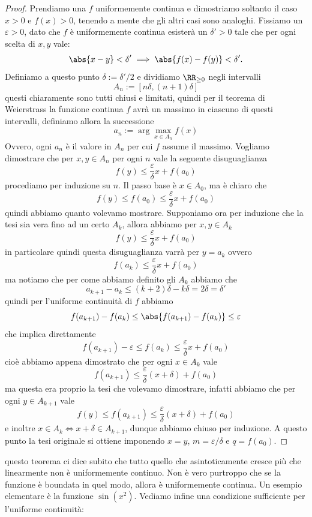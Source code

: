 \documentclass[11pt]{scrartcl}
\begin{document}
	\begin{proof}
		Prendiamo una $f$ uniformemente continua e dimostriamo soltanto il caso $x>0$ e $f(x)>0$, tenendo a mente che gli altri casi sono analoghi. Fissiamo un $\varepsilon>0$, dato che $f$ è uniformemente continua esisterà un $\delta'>0$ tale che per ogni scelta di $x,y$ vale:
		$$\abs{x-y}<\delta' \implies \abs{f(x)-f(y)}<\delta'.$$
		Definiamo a questo punto $\delta:=\delta'/2$ e dividiamo $\RR_{\ge 0}$ negli intervalli
		$$A_n:=[n\delta,(n+1)\delta]$$
		questi chiaramente sono tutti chiusi e limitati, quindi per il teorema di Weierstrass la funzione continua $f$ avrà un massimo in ciascuno di questi intervalli, definiamo allora la successione
		$$a_n:=\arg\max_{x\in A_n}f(x)$$
		Ovvero, ogni $a_n$ è il valore in $A_n$ per cui $f$ assume il massimo. Vogliamo dimostrare che per $x,y\in A_n$ per ogni $n$ vale la seguente disuguaglianza
		$$f(y)\le \frac{\varepsilon}{\delta}x+f(a_0)$$
		procediamo per induzione su $n$. Il passo base è $x\in A_0$, ma è chiaro che 
		$$f(y)\le f(a_0) \le \frac{\varepsilon}{\delta}x+f(a_0)$$
		quindi abbiamo quanto volevamo mostrare. Supponiamo ora per induzione che la tesi sia vera fino ad un certo $A_k$, allora abbiamo per $x,y\in A_k$
		$$f(y)\le \frac{\varepsilon}{\delta}x+f(a_0)$$
		in particolare quindi questa disuguaglianza varrà per $y=a_k$ ovvero
		$$f(a_k)\le \frac{\varepsilon}{\delta}x+f(a_0)$$
		ma notiamo che per come abbiamo definito gli $A_k$ abbiamo che
		$$a_{k+1}-a_k\le (k+2)\delta-k\delta=2\delta=\delta'$$
		quindi per l'uniforme continuità di $f$ abbiamo
		$$f(a_{k+1})-f(a_k)\le\abs{f(a_{k+1})-f(a_k)}\le \varepsilon$$
		che implica direttamente
		$$f(a_{k+1})-\varepsilon\le f(a_k)\le \frac{\varepsilon}{\delta}x+f(a_0)$$
		cioè abbiamo appena dimostrato che per ogni $x\in A_k$ vale
		$$f(a_{k+1})\le \frac{\varepsilon}{\delta}(x+\delta)+f(a_0)$$
		ma questa era proprio la tesi che volevamo dimostrare, infatti abbiamo che per ogni $y\in A_{k+1}$ vale 
		$$f(y)\le f(a_{k+1})\le \frac{\varepsilon}{\delta}(x+\delta)+f(a_0)$$
		e inoltre $x\in A_k \iff x+\delta\in A_{k+1}$, dunque abbiamo chiuso per induzione. A questo punto la tesi originale si ottiene imponendo $x=y$, $m=\varepsilon/\delta$ e $q=f(a_0)$.
	\end{proof}
	questo teorema ci dice subito che tutto quello che asintoticamente cresce più che linearmente non è uniformemente continuo. Non è vero purtroppo che se la funzione è boundata in quel modo, allora è uniformemente continua. Un esempio elementare è la funzione $\sin(x^2)$. Vediamo infine una condizione sufficiente per l'uniforme continuità:
\end{document}
